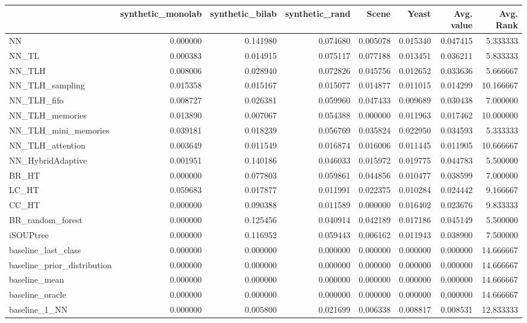 \begin{tabular}{lrrrrrrr}
\toprule
 & synthetic_monolab & synthetic_bilab & synthetic_rand & Scene & Yeast & Avg. value & Avg. Rank \\
\midrule
NN & 0.000000 & 0.141980 & 0.074680 & 0.005078 & 0.015340 & 0.047415 & 5.333333 \\
NN_TL & 0.000383 & 0.014915 & 0.075117 & 0.077188 & 0.013451 & 0.036211 & 5.833333 \\
NN_TLH & 0.008006 & 0.028940 & 0.072826 & 0.045756 & 0.012652 & 0.033636 & 5.666667 \\
NN_TLH_sampling & 0.015358 & 0.015167 & 0.015077 & 0.014877 & 0.011015 & 0.014299 & 10.166667 \\
NN_TLH_fifo & 0.008727 & 0.026381 & 0.059960 & 0.047433 & 0.009689 & 0.030438 & 7.000000 \\
NN_TLH_memories & 0.013890 & 0.007067 & 0.054388 & 0.000000 & 0.011963 & 0.017462 & 10.000000 \\
NN_TLH_mini_memories & 0.039181 & 0.018239 & 0.056769 & 0.035824 & 0.022950 & 0.034593 & 5.333333 \\
NN_TLH_attention & 0.003649 & 0.011549 & 0.016874 & 0.016006 & 0.011445 & 0.011905 & 10.666667 \\
NN_HybridAdaptive & 0.001951 & 0.140186 & 0.046033 & 0.015972 & 0.019775 & 0.044783 & 5.500000 \\
BR_HT & 0.000000 & 0.077803 & 0.059861 & 0.044856 & 0.010477 & 0.038599 & 7.000000 \\
LC_HT & 0.059683 & 0.017877 & 0.011991 & 0.022375 & 0.010284 & 0.024442 & 9.166667 \\
CC_HT & 0.000000 & 0.090388 & 0.011589 & 0.000000 & 0.016402 & 0.023676 & 9.833333 \\
BR_random_forest & 0.000000 & 0.125456 & 0.040914 & 0.042189 & 0.017186 & 0.045149 & 5.500000 \\
iSOUPtree & 0.000000 & 0.116952 & 0.059443 & 0.006162 & 0.011943 & 0.038900 & 7.500000 \\
baseline_last_class & 0.000000 & 0.000000 & 0.000000 & 0.000000 & 0.000000 & 0.000000 & 14.666667 \\
baseline_prior_distribution & 0.000000 & 0.000000 & 0.000000 & 0.000000 & 0.000000 & 0.000000 & 14.666667 \\
baseline_mean & 0.000000 & 0.000000 & 0.000000 & 0.000000 & 0.000000 & 0.000000 & 14.666667 \\
baseline_oracle & 0.000000 & 0.000000 & 0.000000 & 0.000000 & 0.000000 & 0.000000 & 14.666667 \\
baseline_1_NN & 0.000000 & 0.005800 & 0.021699 & 0.006338 & 0.008817 & 0.008531 & 12.833333 \\
\bottomrule
\end{tabular}
